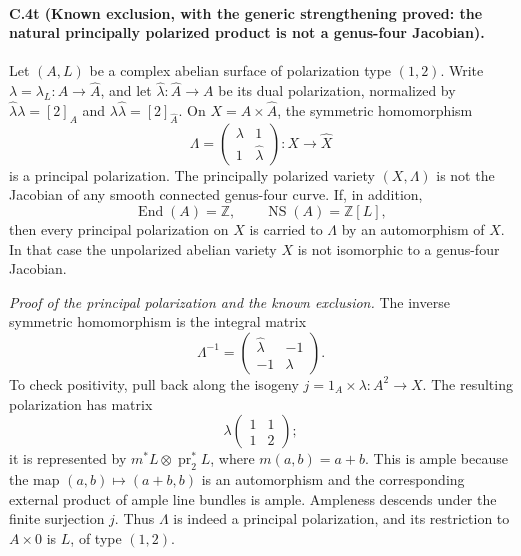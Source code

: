 \paragraph{C.4t (Known exclusion, with the generic strengthening proved: the natural principally polarized product is not a genus-four Jacobian).}
Let $(A,L)$ be a complex abelian surface of polarization type $(1,2)$.
Write $\lambda=\lambda_L:A\to\widehat A$, and let
$\widehat\lambda:\widehat A\to A$ be its dual polarization, normalized by
$\widehat\lambda\lambda=[2]_A$ and
$\lambda\widehat\lambda=[2]_{\widehat A}$.
On $X=A\times\widehat A$, the symmetric homomorphism
\[
 \Lambda=
 \begin{pmatrix}\lambda&1\\1&\widehat\lambda\end{pmatrix}
 :X\longrightarrow\widehat X
\]
is a principal polarization. The principally polarized variety
$(X,\Lambda)$ is not the Jacobian of any smooth connected genus-four
curve. If, in addition,
\[
             \operatorname{End}(A)=\mathbb Z,\qquad
             \operatorname{NS}(A)=\mathbb Z[L],
\]
then every principal polarization on $X$ is carried to $\Lambda$
by an automorphism of $X$. In that case the unpolarized abelian
variety $X$ is not isomorphic to a genus-four Jacobian.

\emph{Proof of the principal polarization and the known exclusion.}
The inverse symmetric homomorphism is the integral matrix
\[
 \Lambda^{-1}=
 \begin{pmatrix}\widehat\lambda&-1\\-1&\lambda\end{pmatrix}.
\]
To check positivity, pull back along the isogeny
$j=1_A\times\lambda:A^2\to X$. The resulting polarization has
matrix
\[
 \lambda\begin{pmatrix}1&1\\1&2\end{pmatrix};
\]
it is represented by $m^*L\otimes\operatorname{pr}_2^*L$, where
$m(a,b)=a+b$. This is ample because the map
$(a,b)\mapsto(a+b,b)$ is an automorphism and the corresponding
external product of ample line bundles is ample. Ampleness
descends under the finite surjection $j$. Thus $\Lambda$ is
indeed a principal polarization, and its restriction to
$A\times0$ is $L$, of type $(1,2)$.

